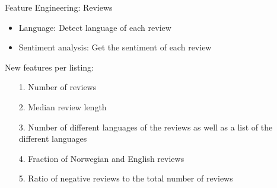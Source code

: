 \documentclass[ngerman,inputenc]{beamer}
\begin{document}
\begin{frame}{Feature Engineering: Reviews}
  \begin{itemize}
    \item Language: Detect language of each review
    \item Sentiment analysis: Get the sentiment of each review
  \end{itemize}

  \pause

  \hspace{5pt}
  
  New features per listing:
  \begin{itemize}
    \item[1.] Number of reviews
    \item[2.] Median review length
    \item[3.] Number of different languages of the reviews as well as a list of the different languages
    \item[4.] Fraction of Norwegian and English reviews
    \item[5.] Ratio of negative reviews to the total number of reviews
  \end{itemize}

\end{frame}
\end{document}
